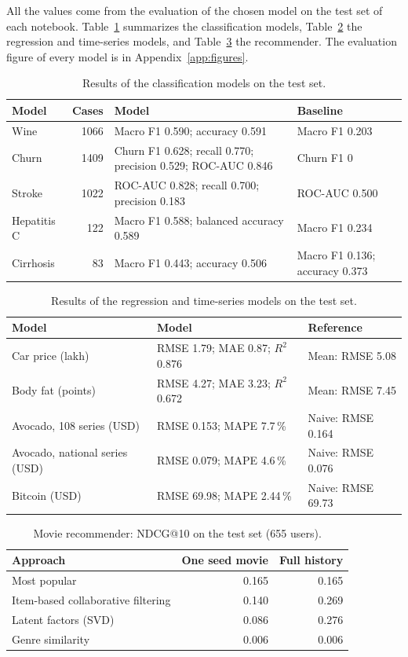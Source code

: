 \documentclass[11pt,letterpaper]{article}
\begin{document}
All the values come from the evaluation of the chosen model on the test set of each notebook. Table~\ref{tab:classification} summarizes the classification models, Table~\ref{tab:regression} the regression and time-series models, and Table~\ref{tab:movies} the recommender. The evaluation figure of every model is in Appendix~\ref{app:figures}.

\begin{table}[H]
\centering
\caption{Results of the classification models on the test set.}
\label{tab:classification}
\begin{tabularx}{\textwidth}{lrXX}
\toprule
Model & Cases & Model & Baseline \\
\midrule
Wine & 1066 & Macro F1 0.590; accuracy 0.591 & Macro F1 0.203 \\
Churn & 1409 & Churn F1 0.628; recall 0.770; precision 0.529; ROC-AUC 0.846 & Churn F1 0 \\
Stroke & 1022 & ROC-AUC 0.828; recall 0.700; precision 0.183 & ROC-AUC 0.500 \\
Hepatitis C & 122 & Macro F1 0.588; balanced accuracy 0.589 & Macro F1 0.234 \\
Cirrhosis & 83 & Macro F1 0.443; accuracy 0.506 & Macro F1 0.136; accuracy 0.373 \\
\bottomrule
\end{tabularx}
\end{table}

\begin{table}[H]
\centering
\caption{Results of the regression and time-series models on the test set.}
\label{tab:regression}
\begin{tabularx}{\textwidth}{lXX}
\toprule
Model & Model & Reference \\
\midrule
Car price (lakh) & RMSE 1.79; MAE 0.87; $R^2$ 0.876 & Mean: RMSE 5.08 \\
Body fat (points) & RMSE 4.27; MAE 3.23; $R^2$ 0.672 & Mean: RMSE 7.45 \\
Avocado, 108 series (USD) & RMSE 0.153; MAPE 7.7\,\% & Naive: RMSE 0.164 \\
Avocado, national series (USD) & RMSE 0.079; MAPE 4.6\,\% & Naive: RMSE 0.076 \\
Bitcoin (USD) & RMSE 69.98; MAPE 2.44\,\% & Naive: RMSE 69.73 \\
\bottomrule
\end{tabularx}
\end{table}

\begin{table}[H]
\centering
\caption{Movie recommender: NDCG@10 on the test set (655 users).}
\label{tab:movies}
\begin{tabular}{lrr}
\toprule
Approach & One seed movie & Full history \\
\midrule
Most popular & 0.165 & 0.165 \\
Item-based collaborative filtering & 0.140 & 0.269 \\
Latent factors (SVD) & 0.086 & 0.276 \\
Genre similarity & 0.006 & 0.006 \\
\bottomrule
\end{tabular}
\end{table}
\end{document}
